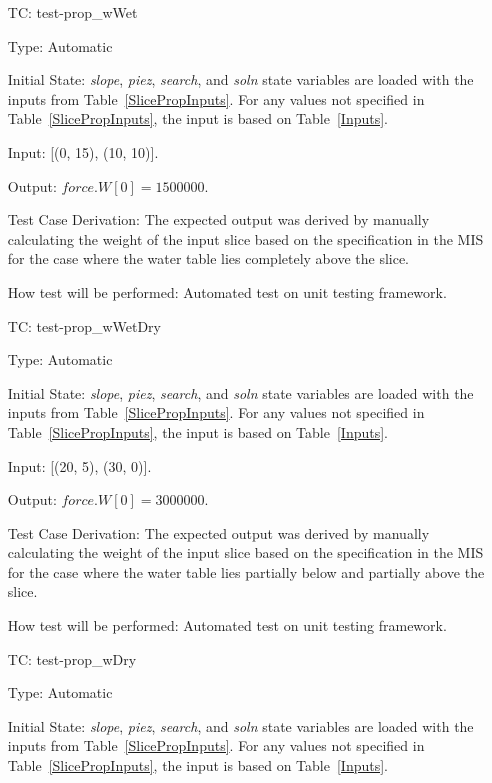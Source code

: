 \documentclass[12pt, titlepage]{article}
\newcounter{utestnum} %
\begin{document}
\begin{enumerate}[label=TC\arabic*:,ref={\arabic*}]
	
	\item [TC\refstepcounter{utestnum}\theutestnum: 
	\label{TC_PropertyWWet}] 
	test-prop\_wWet
	
	Type: Automatic
	
	Initial State: \textit{slope}, \textit{piez}, \textit{search}, and 
	\textit{soln} state variables are loaded with the inputs from 
	Table~\ref{SlicePropInputs}. For any values not specified in 
	Table~\ref{SlicePropInputs}, the input is based on Table~\ref{Inputs}.
	
	Input: [(0, 15), (10, 10)].
	
	Output: $\textit{force.W}[0] = 1500000$.
	
	Test Case Derivation: The expected output was derived by manually 
	calculating the weight of the input slice based on the specification in the 
	MIS for the case where the water table lies completely above the slice.
	
	How test will be performed: Automated test on unit testing framework.
	
	\item [TC\refstepcounter{utestnum}\theutestnum: 
	\label{TC_PropertyWWetDry}] 
	test-prop\_wWetDry
	
	Type: Automatic
	
	Initial State: \textit{slope}, \textit{piez}, \textit{search}, and 
	\textit{soln} state variables are loaded with the inputs from 
	Table~\ref{SlicePropInputs}. For any values not specified in 
	Table~\ref{SlicePropInputs}, the input is based on Table~\ref{Inputs}.
	
	Input: [(20, 5), (30, 0)].
	
	Output: $\textit{force.W}[0] = 3000000$.
	
	Test Case Derivation: The expected output was derived by manually 
	calculating the weight of the input slice based on the specification in the 
	MIS for the case where the water table lies partially below and partially 
	above the slice.
	
	How test will be performed: Automated test on unit testing framework.
	
	\item [TC\refstepcounter{utestnum}\theutestnum: 
	\label{TC_PropertyWDry}] 
	test-prop\_wDry
	
	Type: Automatic
	
	Initial State: \textit{slope}, \textit{piez}, \textit{search}, and 
	\textit{soln} state variables are loaded with the inputs from 
	Table~\ref{SlicePropInputs}. For any values not specified in 
	Table~\ref{SlicePropInputs}, the input is based on Table~\ref{Inputs}.
	

\end{enumerate}
\end{document}
